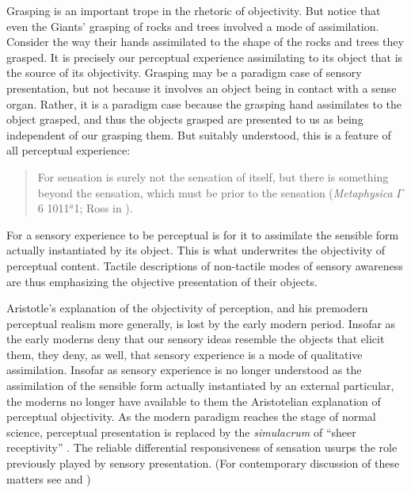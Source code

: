 Grasping is an important trope in the rhetoric of objectivity. But notice that even the Giants' grasping of rocks and trees involved a mode of assimilation. Consider the way their hands assimilated to the shape of the rocks and trees they grasped. It is precisely our perceptual experience assimilating to its object that is the source of its objectivity.  Grasping may be a paradigm case of sensory presentation, but not because it involves an object being in contact with a sense organ. Rather, it is a paradigm case because the grasping hand assimilates to the object grasped, and thus the objects grasped are presented to us as being independent of our grasping them. But suitably understood, this is a feature of all perceptual experience:
\begin{quote}
	For sensation is surely not the sensation of itself, but there is something beyond the sensation, which must be prior to the sensation (\emph{Metaphysica} \( \Gamma \) 6 1011\( ^{a} \)1; Ross in \citealt[56]{Barnes:1984kx}).
\end{quote}
For a sensory experience to be perceptual is for it to assimilate the sensible form actually instantiated by its object. This is what underwrites the objectivity of perceptual content. Tactile descriptions of non-tactile modes of sensory awareness are thus emphasizing the objective presentation of their objects.

Aristotle's explanation of the objectivity of perception, and his premodern perceptual realism more generally, is lost by the early modern period. Insofar as the early moderns deny that our sensory ideas resemble the objects that elicit them, they deny, as well, that sensory experience is a mode of qualitative assimilation. Insofar as sensory experience is no longer understood as the assimilation of the sensible form actually instantiated by an external particular, the moderns no longer have available to them the Aristotelian explanation of perceptual objectivity. As the modern paradigm reaches the stage of normal science, perceptual presentation is replaced by the \emph{simulacrum} of ``sheer receptivity'' \citep[16]{Sellars:1967uq}. The reliable differential responsiveness of sensation usurps the role previously played by sensory presentation. (For contemporary discussion of these matters see \citealt{McDowell:1998vn} and \citealt{Kalderon:2011fk})

